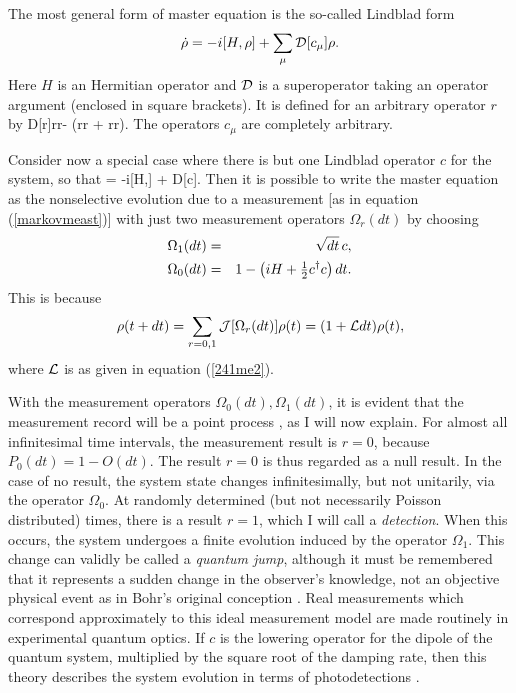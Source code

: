 \documentclass[12pt]{article}
\begin{document}
The most general form of master equation is the so-called Lindblad form
\cite{Lin76,Gar91}
\begin{equation} \label{241me1} \label{Lin}
\dot{\rho} = -{i}[H,\rho] + \sum_\mu  {\cal D}[c_\mu] \rho.
\end{equation}
Here $H$ is an Hermitian operator and ${\cal D}$ is a 
superoperator taking an operator argument (enclosed in square brackets). It is 
defined for an arbitrary operator $r$ by
\beq \label{defcalD}
{\cal D}[r]\rho \equiv r\rho r\dg -  (r\dg r \rho + \rho r\dg r).
\eeq
The operators $c_\mu$ are completely arbitrary. 

Consider now a special case where there is but one Lindblad operator $c$ for the
system, so that 
\beq \label{241me2}
\dot{\rho} = -i[H,\rho] + {\cal D}[c]\rho {}\rho.
\eeq
 Then it is possible to write the master
equation as the nonselective evolution due to a measurement [as in equation
(\ref{markovmeast})] with just two measurement operators $\Omega_r(dt)$ by choosing
\begin{eqnarray} \Omega_1(dt) &=& \sqrt{dt}\, c , \\
\Omega_0(dt) &= &1 - \left( {i}H + \mbox{$\frac{1}{2}$}c^\dagger c \right) dt.
\end{eqnarray}
This is because 
\begin{equation} \label{me2a}
\rho(t+dt) = \sum_{r=0,1} {\cal J}[\Omega_r(dt)] \rho(t) 
 = (1+{\cal L}dt)\rho(t),
\end{equation}
where ${\cal L}$ is as given in equation (\ref{241me2}). 

With the measurement operators $\Omega_0(dt),\Omega_1(dt)$, 
it is evident that the measurement record will be a point process \cite{CoxIsh80},
as I will now explain. For almost all infinitesimal time intervals, the  measurement
result is $r = 0$, because $P_0(dt) = 1 - O(dt)$. The result $r=0$ is thus
regarded as a  null result. In the case of no result, the system state changes
infinitesimally, but not unitarily, via the operator  $\Omega_0$. At randomly
determined (but not necessarily Poisson  distributed) times, there is a result $r =
1$, which I will call  a {\em detection}. When this occurs, the system undergoes a
finite  evolution induced by the operator $\Omega_1$. This change can validly be 
called a {\em quantum jump}, although it must be remembered that it  represents a
sudden change in the observer's knowledge, not an  objective physical event as in
Bohr's original conception  \cite{Boh13}. Real measurements 
which correspond approximately to this ideal measurement model are made routinely 
in experimental quantum 
optics. If $c$ is the lowering operator for the dipole of the quantum system,
multiplied by the  square root of the damping rate, then this theory describes 
the  system evolution in terms of photodetections \cite{Wis95b}. 
\end{document}

